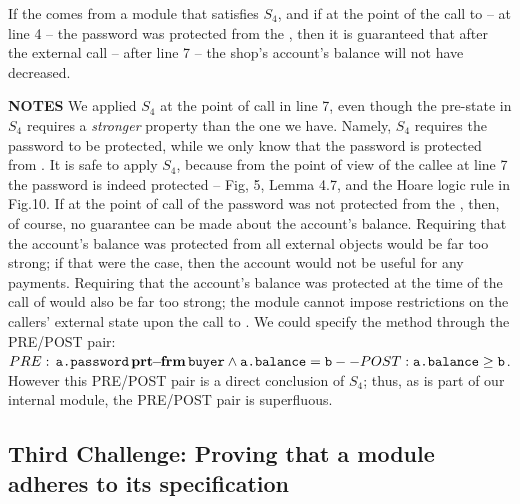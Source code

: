 \noindent
 
If the  comes from a module that satisfies $S_4$, and if at the point of the call to  -- \ie at line 4 -- the password was protected from the , then it is guaranteed that after the external call -- \ie after line 7 --  the shop's account's balance will not have decreased.

 

\vspace{.1cm}

  \noindent
 \textbf{NOTES}
 \notesep We   applied $S_4$ at the point of call in line 7, even   though  
 the pre-state in $S_4$ requires %
 a \emph{stronger} property than the one we have.
 Namely,   $S_4$ requires   the password to be protected, while we only know 
  that the password is protected from   .
It is safe to apply $S_4$,  because from the point of view of the callee at line 7 the password is indeed protected -- \cf Fig, 5,   Lemma 4.7, and the 
  Hoare logic rule in Fig.10.
  \notesep  If at the point of call of  the password was not protected from the , then, of course, no guarantee can be made about the account's balance.
 \notesep Requiring that the account's balance was protected from all external objects would be far too strong; if that were the case, then the account would not be useful for any payments.
 \notesep Requiring that the account's balance was protected at the time of the call of  would also be far too strong; the module cannot impose restrictions on the callers' external state  upon the call to .
 \notesep 
 We could specify the method  through the PRE/POST pair: $PRE: {\, {\texttt{a.password}}\, \mathbf{prt\!\!-\!\!frm}\, {\texttt{buyer}}} \wedge {{\texttt{a.balance}}}={\texttt{b}} -- POST: {\texttt{a.balance}}\geq {\texttt{b}}$. However this PRE/POST pair is a direct conclusion of $S_4$; thus, as  is part of our internal module, the PRE/POST pair is superfluous.
 
 
 \subsection{Third Challenge: Proving that a module adheres to its specification}
 \label{sec:howThird}
 
